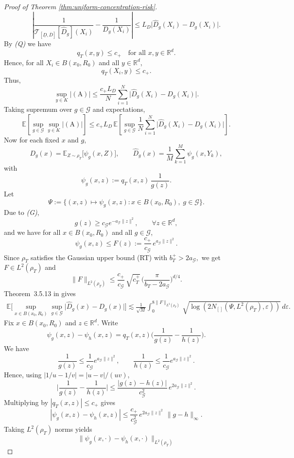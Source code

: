 \documentclass[11pt]{article}
\theoremstyle{remark}
\numberwithin{equation}{section}
\newcommand{\R}{\mathbb{R}}
\newcommand{\E}{\mathbb{E}}
\def\bmax{b_T^{+}}
\def\cmax{c_{+}}
\def\cTmax{c_T^{+}}
\def\aGmin{a_{\mathcal{G}}}
\def\cGmin{c_{\mathcal{G}}}
\begin{document}
\begin{proof}[Proof of Theorem \ref{thm:uniform-concentration-risk}]
\[
  \left|
    \frac{1}{\mathcal{T}_{[\underline{D},\overline{D}]}[\widehat D_g](X_i)} - \frac{1}{D_g(X_i)}
  \right|
  \le
  L_D
  \bigl|
    \widehat{D}_g(X_i) - D_g(X_i)
  \bigr|.
\]
By \emph{(Q)} we have
\[
  q_T(x, y) \le \cmax \quad \text{for all } x, y \in\mathbb{R}^d.
\]
Hence, for all $X_i\in B(x_0, R_0)$ and all $y\in \R^d$,
\[
  q_T(X_i,y) \le \cmax.
\]
Thus, 
\[
  \sup_{y\in K}|(\mathrm{A})|
  \le
  \frac{\cmax L_D}{N}
  \sum_{i=1}^N
    \bigl|
      \widehat{D}_g(X_i) - D_g(X_i)
    \bigr|.
\]
Taking supremum over $g\in\mathcal{G}$ and expectations,
\[
  \mathbb{E}
  \left[
    \sup_{g\in\mathcal{G}}\sup_{y\in K}|(\mathrm{A})|
  \right]
  \le
  \cmax L_D\,
  \mathbb{E}
  \left[
    \sup_{g\in\mathcal{G}}
      \frac{1}{N}\sum_{i=1}^N
        \bigl|
          \widehat{D}_g(X_i) - D_g(X_i)
        \bigr|
  \right].
\]
Now for each fixed $x$ and $g$,
\[
  D_g(x)
  =
  \mathbb{E}_{Z\sim\rho_T}\bigl[\psi_g(x,Z)\bigr],
  \qquad
  \widehat{D}_g(x)
  =
  \frac{1}{M}\sum_{k=1}^M \psi_g(x,Y_k),
\]
with
\[
  \psi_g(x,z)
  :=
  q_T(x,z)\,\frac{1}{g(z)}.
\]
Let
\[
  \Psi
  :=
  \bigl\{
    (x,z)\mapsto \psi_g(x,z)
   : x\in B(x_0, R_0),\;g\in\mathcal{G}
  \bigr\}.
\]
Due to \emph{(G)}, 
\[
  g(z)\ge \cGmin e^{-\aGmin\|z\|^2},\qquad \forall z\in\R^d,
\]
and we have  for all $x\in B(x_0,R_0)$ and all $g\in\mathcal G$,
\[
  \psi_g(x,z)\le F(z):=\frac{c_+}{\cGmin}\,e^{\aGmin\|z\|^2}.
\]
Since  $\rho_T$ satisfies the Gaussian upper bound (RT) with $\bmax>2\aGmin,$
we get $F\in L^2(\rho_T)$ and
\[
  \|F\|_{L^2(\rho_T)}
  \le
  \frac{c_+}{\cGmin}\,\sqrt{\cTmax}\,
  \Big(\frac{\pi}{b_T-2\aGmin}\Big)^{d/4}.
\]
Theorem~3.5.13 in \cite{GineNickl2016} gives
\begin{align}
\E\Big[\sup_{x\in B(x_0,R_0)}\sup_{g\in\mathcal G}
  \big|\widehat D_g(x)-D_g(x)\big|\Big]
\lesssim \frac{1}{\sqrt{M}} \int_{0}^{8 \|F\|_{L^2(\rho_T)}} \sqrt{\log(2 N_{[]}(\Psi, L^{2}(\rho_T), \varepsilon))} \, d\varepsilon.
\end{align}
Fix $x\in B(x_0,R_0)$ and $z\in\R^d$. Write
\[
  \psi_g(x,z)-\psi_h(x,z)
  =
  q_T(x,z)\Big(\frac1{g(z)}-\frac1{h(z)}\Big).
\]
We have
\[
  \frac1{g(z)}\le \frac1{\cGmin}e^{\aGmin\|z\|^2},
  \qquad
  \frac1{h(z)}\le \frac1{\cGmin}e^{\aGmin\|z\|^2}.
\]
Hence, using $|1/u-1/v|=|u-v|/(uv)$,
\[
  \Big|\frac1{g(z)}-\frac1{h(z)}\Big|
  \le
  \frac{|g(z)-h(z)|}{\cGmin^2}\,e^{2\aGmin\|z\|^2}.
\]
Multiplying by $|q_T(x,z)|\le \cmax$ gives
\[
  |\psi_g(x,z)-\psi_h(x,z)|
  \le
  \frac{\cmax}{\cGmin^2}\,e^{2\aGmin\|z\|^2}\,\|g-h\|_\infty.
\]
Taking $L^2(\rho_T)$ norms yields
\[
  \|\psi_g(x,\cdot)-\psi_h(x,\cdot)\|_{L^2(\rho_T)}
\]
\end{proof}
\end{document}
